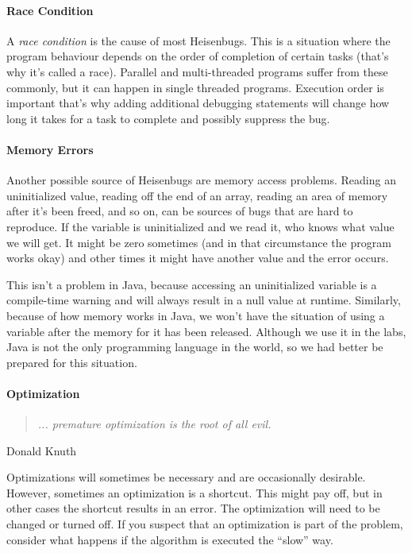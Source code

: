 \paragraph{Race Condition}
A \emph{race condition} is the cause of most Heisenbugs. This is a situation where the program behaviour depends on the order of completion of certain tasks (that's why it's called a race). Parallel and multi-threaded programs suffer from these commonly, but it can happen in single threaded programs. Execution order is important that's why adding additional debugging statements will change how long it takes for a task to complete and possibly suppress the bug.

\paragraph{Memory Errors}
Another possible source of Heisenbugs are memory access problems. Reading an uninitialized value, reading off the end of an array, reading an area of memory after it's been freed, and so on, can be sources of bugs that are hard to reproduce. If the variable is uninitialized and we read it, who knows what value we will get. It might be zero sometimes (and in that circumstance the program works okay) and other times it might have another value and the error occurs.

This isn't a problem in Java, because accessing an uninitialized variable is a compile-time warning and will always result in a null value at runtime. Similarly, because of how memory works in Java, we won't have the situation of using a variable after the memory for it has been released. Although we use it in the labs, Java is not the only programming language in the world, so we had better be prepared for this situation.

\paragraph{Optimization}
\begin{quote}
	\emph{... premature optimization is the root of all evil.}
\end{quote}
\hfill Donald Knuth

Optimizations will sometimes be necessary and are occasionally desirable. However, sometimes an optimization is a shortcut. This might pay off, but in other cases the shortcut results in an error. The optimization will need to be changed or turned off. If you suspect that an optimization is part of the problem, consider what happens if the algorithm is executed the ``slow'' way.


